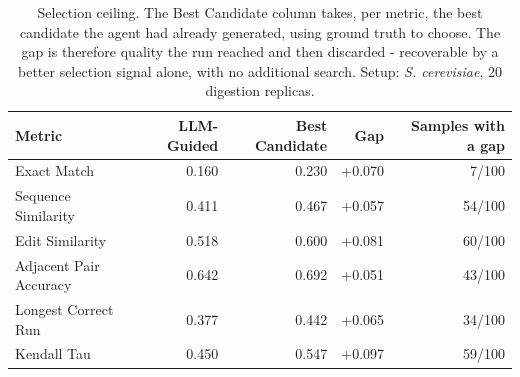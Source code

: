 \begin{table}[!tb]
  \centering
  \caption{Selection ceiling. The Best Candidate column takes, per metric, the best candidate the agent had already generated, using ground truth to choose. The gap is therefore quality the run reached and then discarded - recoverable by a better selection signal alone, with no additional search. Setup: \textnormal{\textnormal{\textit{S. cerevisiae}}}, 20 digestion replicas.}
  \label{tab:selection_ceiling_yeast_r20}
  \begin{tabular}{lrrrr}
    \toprule
    Metric & LLM-Guided & Best Candidate & Gap & Samples with a gap \\
    \midrule
    Exact Match & 0.160 & 0.230 & +0.070 & 7/100 \\
    Sequence Similarity & 0.411 & 0.467 & +0.057 & 54/100 \\
    Edit Similarity & 0.518 & 0.600 & +0.081 & 60/100 \\
    Adjacent Pair Accuracy & 0.642 & 0.692 & +0.051 & 43/100 \\
    Longest Correct Run & 0.377 & 0.442 & +0.065 & 34/100 \\
    Kendall Tau & 0.450 & 0.547 & +0.097 & 59/100 \\
    \bottomrule
  \end{tabular}
\end{table}
